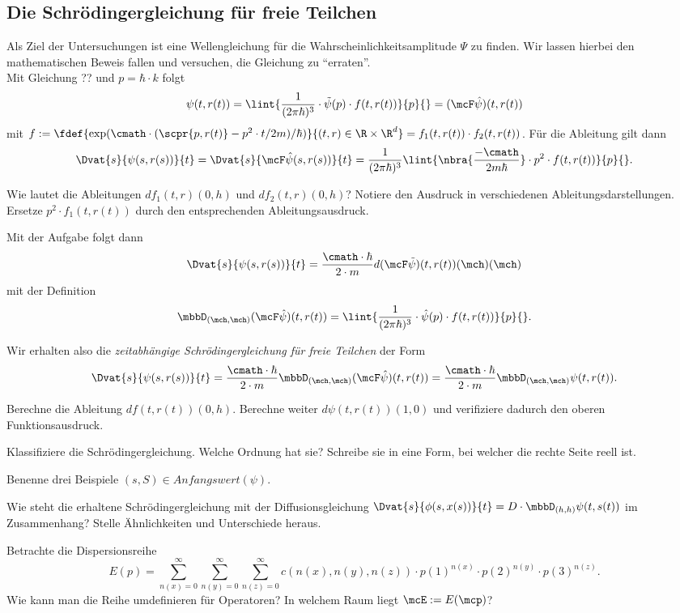 \documentclass{subfiles}
\begin{document}
    \subsection{Die Schrödingergleichung für freie Teilchen}
    Als Ziel der Untersuchungen ist eine Wellengleichung für die Wahrscheinlichkeitsamplitude $\Psi$ zu finden. Wir lassen hierbei den mathematischen Beweis fallen und versuchen, die Gleichung zu \enquote{erraten}.\\
    Mit Gleichung ?? und $p = \hbar\cdot k$ folgt 
    \[\psi(t,r(t)) = \lint{\frac{1}{(2\pi\hbar)^3}\cdot\tilde\psi(p)\cdot f(t,r(t))}{p}{} = (\mcF \hat\psi)(t,r(t))\]
    mit $f:=\fdef{\exp(\cmath\cdot(\scpr{p,r(t)}-p^2\cdot t/2m)/\hbar)}{(t,r)\in\R\times\R^d} = f_1(t,r(t))\cdot f_2(t,r(t))$. Für die Ableitung gilt dann
    \[\Dvat{s}{\psi(s,r(s))}{t} = \Dvat{s}{\mcF\hat\psi(s,r(s))}{t} = \frac{1}{(2\pi\hbar)^3}\lint{\nbra{\frac{-\cmath}{2m\hbar}}\cdot p^2\cdot f(t,r(t))}{p}{}.\]
    \begin{Aufgabe}
        \nr{} Wie lautet die Ableitungen $df_1(t,r)(0,h)$ und $df_2(t,r)(0,h)$? Notiere den Ausdruck in verschiedenen Ableitungsdarstellungen. Ersetze $p^2\cdot f_1(t,r(t))$ durch den entsprechenden Ableitungsausdruck. 
    \end{Aufgabe}
    \noindent Mit der Aufgabe folgt dann 
    \[\Dvat{s}{\psi(s,r(s))}{t} = \frac{\cmath\cdot\hbar}{2\cdot m} d(\mcF\tilde\psi)(t,r(t))(\mch)(\mch)\]
    mit der Definition 
    \[\mbbD_{(\mch,\mch)}(\mcF\hat\psi)(t,r(t)) = \lint{\frac{1}{(2\pi\hbar)^3}\cdot\hat\psi(p)\cdot f(t,r(t))}{p}{}.\]
    \begin{whiteframedr}
        Wir erhalten also die \emph{zeitabhängige Schrödingergleichung für freie Teilchen} der Form
        \[\Dvat{s}{\psi(s,r(s))}{t} = \frac{\cmath\cdot\hbar}{2\cdot m} \mbbD_{(\mch,\mch)}(\mcF\hat\psi)(t,r(t)) = \frac{\cmath\cdot\hbar}{2\cdot m} \mbbD_{(\mch,\mch)}\psi(t,r(t)).\]
    \end{whiteframedr}

    \begin{Aufgabe}
        \nr{} Berechne die Ableitung $df(t,r(t))(0,h)$. Berechne weiter $d\psi(t,r(t))(1,0)$ und verifiziere dadurch den oberen Funktionsausdruck.

        \nr{} Klassifiziere die Schrödingergleichung. Welche Ordnung hat sie? Schreibe sie in eine Form, bei welcher die rechte Seite reell ist. 

        \nr{} Benenne drei Beispiele $(s,S)\in\textit{Anfangswert}(\psi)$. 

        \nr{} Wie steht die erhaltene Schrödingergleichung mit der Diffusionsgleichung $\Dvat{s}{\phi(s,x(s))}{t} = D\cdot \mbbD_{(h,h)}\psi(t,s(t))$ im Zusammenhang? Stelle Ähnlichkeiten und Unterschiede heraus. 

        \nr{} Betrachte die Dispersionsreihe 
        \[E(p) = \sum_{n(x) = 0}^\infty\sum_{n(y) = 0}^\infty\sum_{n(z) = 0}^\infty c(n(x),n(y),n(z))\cdot p(1)^{n(x)}\cdot p(2)^{n(y)}\cdot p(3)^{n(z)}.\]
        Wie kann man die Reihe umdefinieren für Operatoren? In welchem Raum liegt $\mcE:=E(\mcp)$?
    \end{Aufgabe}
\end{document}
